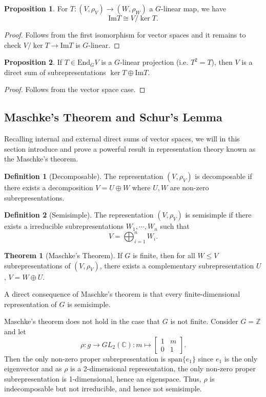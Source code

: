 \documentclass[]{article}
\theoremstyle{definition}
\newtheorem{theorem}{Theorem}
\theoremstyle{definition}
\newtheorem{definition}{Definition}[section]
\newtheorem{proposition}{Proposition}[section]
\begin{document}
\begin{proposition}
  For \(T : (V, \rho_V) \to (W, \rho_W)\) a \(G\)-linear map, we have 
  \[\text{Im} T \cong V / \ker T.\]
\end{proposition}
\begin{proof}
  Follows from the first isomorphism for vector spaces and it remains to check 
  \(V / \ker T \to \text{Im} T\) is \(G\)-linear.
\end{proof}

\begin{proposition}
  If \(T \in \text{End}_G V\) is a \(G\)-linear projection (i.e. \(T^2 = T\)), 
  then \(V\) is a direct sum of subrepresentations \(\ker T \oplus \text{Im} T\).
\end{proposition}
\begin{proof}
  Follows from the vector space case.
\end{proof}

\subsection{Maschke's Theorem and Schur's Lemma}

Recalling internal and external direct sums of vector spaces, we will in this 
section introduce and prove a powerful result in representation theory known as 
the Maschke's theorem.

\begin{definition}[Decomposable]
  The representation \((V, \rho_V)\) is decomposable if there exists a 
  decomposition \(V = U \oplus W\) where \(U, W\) are non-zero subrepresentations.
\end{definition}

\begin{definition}[Semisimple]
  The representation \((V, \rho_V)\) is semisimple if there exists a 
  irreducible subrepresentations \(W_1, \cdots, W_n\) such that 
  \[V = \bigoplus_{i = 1}^n W_i.\]
\end{definition}

\begin{theorem}[Maschke's Theorem]
  If \(G\) is finite, then for all \(W \le V\) subrepresentations of 
  \((V, \rho_V)\), there exists a complementary subrepresentation \(U\), 
  \(V = W \oplus U\). 
\end{theorem}

A direct consequence of Maschke's theorem is that every finite-dimensional 
representation of \(G\) is semisimple.

Maschke's theorem does not hold in the case that \(G\) is not finite. 
Consider \(G = \mathbb{Z}\) and let 
\[\rho : g \to GL_2(\mathbb{C}) : m \mapsto \begin{bmatrix}
  1 & m \\ 0 & 1
\end{bmatrix}.\]
Then the only non-zero proper subrepresentation is \(\text{span}\{e_1\}\) since 
\(e_1\) is the only eigenvector and as \(\rho\) is a 2-dimensional representation, 
the only non-zero proper subrepresentation is 1-dimensional, hence an eigenspace.
Thus, \(\rho\) is indecomposable but not irreducible, and hence not semisimple.
\end{document}

